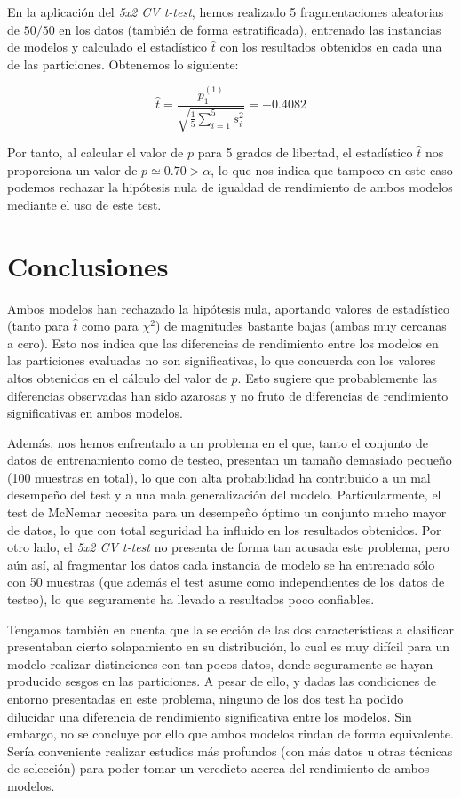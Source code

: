 \documentclass[a4paper,12pt]{article}
\begin{document}
En la aplicación del \textit{5x2 CV t-test}, hemos realizado 5 fragmentaciones aleatorias de $50/50$ en los datos (también de forma estratificada), entrenado las instancias de modelos y calculado el estadístico $\hat{t}$ con los resultados obtenidos en cada una de las particiones. Obtenemos lo siguiente:

\begin{equation}
    \hat{t} = \frac{p_1^{(1)}}{\sqrt{\frac{1}{5} \sum_{i=1}^{5} s^2_i}} = -0.4082
\end{equation}

Por tanto, al calcular el valor de $p$ para 5 grados de libertad, el estadístico $\hat{t}$ nos proporciona un valor de $p\simeq 0.70 > \alpha$, lo que nos indica que tampoco en este caso podemos rechazar la hipótesis nula de igualdad de rendimiento de ambos modelos mediante el uso de este test.


\newpage
\section{Conclusiones}

Ambos modelos han rechazado la hipótesis nula, aportando valores de estadístico (tanto para $\hat{t}$ como para $\chi^2$) de magnitudes bastante bajas (ambas muy cercanas a cero). Esto nos indica que las diferencias de rendimiento entre los modelos en las particiones evaluadas no son significativas, lo que concuerda con los valores altos obtenidos en el cálculo del valor de $p$. Esto sugiere que probablemente las diferencias observadas han sido azarosas y no fruto de diferencias de rendimiento significativas en ambos modelos.

Además, nos hemos enfrentado a un problema en el que, tanto el conjunto de datos de entrenamiento como de testeo, presentan un tamaño demasiado pequeño (100 muestras en total), lo que con alta probabilidad ha contribuido a un mal desempeño del test y a una mala generalización del modelo. Particularmente, el test de McNemar necesita para un desempeño óptimo un conjunto mucho mayor de datos, lo que con total seguridad ha influido en los resultados obtenidos. Por otro lado, el \textit{5x2 CV t-test} no presenta de forma tan acusada este problema, pero aún así, al fragmentar los datos cada instancia de modelo se ha entrenado sólo con 50 muestras (que además el test asume como independientes de los datos de testeo), lo que seguramente ha llevado a resultados poco confiables.

Tengamos también en cuenta que la selección de las dos características a clasificar presentaban cierto solapamiento en su distribución, lo cual es muy difícil para un modelo realizar distinciones con tan pocos datos, donde seguramente se hayan producido sesgos en las particiones. A pesar de ello, y dadas las condiciones de entorno presentadas en este problema, ninguno de los dos test ha podido dilucidar una diferencia de rendimiento significativa entre los modelos. Sin embargo, no se concluye por ello que ambos modelos rindan de forma equivalente. Sería conveniente realizar estudios más profundos (con más datos u otras técnicas de selección) para poder tomar un veredicto acerca del rendimiento de ambos modelos.
\end{document}
